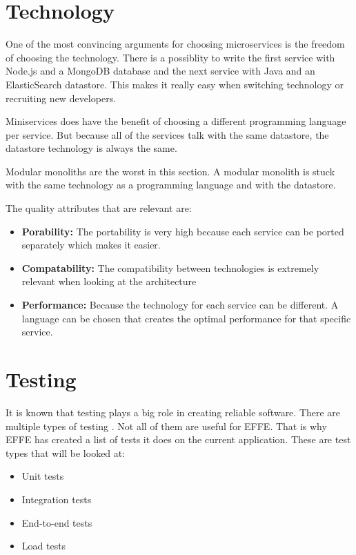 \section{Technology}
\label{sec:Technology}

One of the most convincing arguments for choosing microservices is the freedom of choosing the technology. There is a possiblity to write the first service with Node.js and a MongoDB database and the next service with Java and an ElasticSearch datastore. This makes it really easy when switching technology or recruiting new developers.

Miniservices does have the benefit of choosing a different programming language per service. But because all of the services talk with the same datastore, the datastore technology is always the same.

Modular monoliths are the worst in this section. A modular monolith is stuck with the same technology as a programming language and with the datastore.

The quality attributes that are relevant are:
\begin{itemize}
        \item \textbf{Porability:} The portability is very high because each service can be ported separately which makes it easier.
        \item \textbf{Compatability:} The compatibility between technologies is extremely relevant when looking at the architecture
        \item \textbf{Performance:} Because the technology for each service can be different. A language can be chosen that creates the optimal performance for that specific service.
\end{itemize}

\section{Testing}
\label{sec:Testing}

It is known that testing plays a big role in creating reliable software. There are multiple types of testing \cite{testTypes}. Not all of them are useful for EFFE. That is why EFFE has created a list of tests it does on the current application. These are test types that will be looked at:

\begin{itemize}
        \item Unit tests
        \item Integration tests
        \item End-to-end tests
        \item Load tests
\end{itemize}

